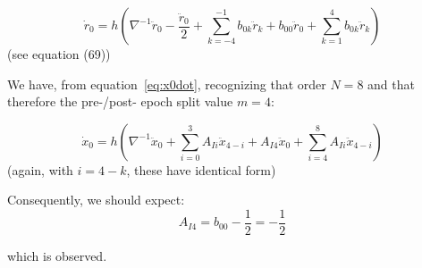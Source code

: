\begin{equation*}
\dot{r}_{0}=h\left(\nabla 
^{-1}{\ddot{r}}_{0}-\frac{{\ddot{r}}_{0}}{2}+\sum_{k=-4}^{-1}b_{0k}\ddot{r}_{k} 
+ b_{00}\ddot{r}_{0} + \sum_{k=1}^{4}b_{0k}\ddot{r}_{k} \right)
\end{equation*}
(see equation (69))


We have, from equation~\ref{eq:x0dot}, recognizing that order $N=8$ and that 
therefore the pre-/post- epoch split value $m = 4$:

\begin{equation*}
\dot{x}_{0}=h\left(\nabla 
^{-1}{\ddot{x}}_{0}+\sum_{i=0}^{3}A_{Ii}\ddot{x}_{4-i} + A_{I4}\ddot{x}_{0} + 
\sum_{i=4}^{8}A_{Ii}\ddot{x}_{4-i} \right)
\end{equation*}
(again, with $i=4-k$, these have identical form)

Consequently, we should expect:  
\begin{equation*}
A_{\mathit{I4}}=b_{00}-\frac{1}{2} = -\frac{1}{2}
\end{equation*}

which is observed.
